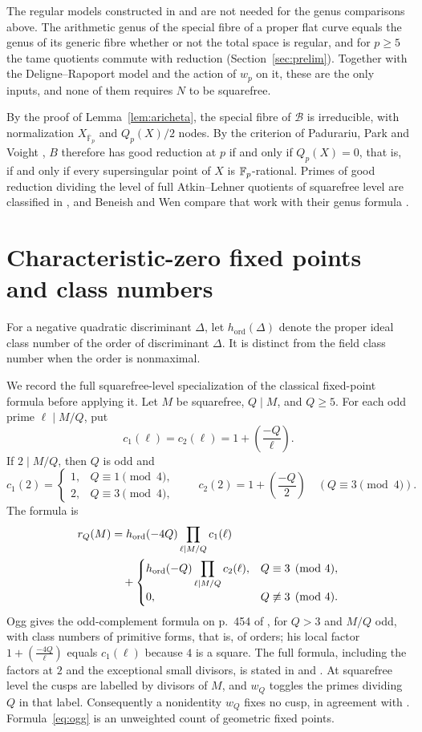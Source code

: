 \documentclass[11pt,a4paper]{article}
\theoremstyle{remark}\newtheorem{remark}[theorem]{Remark}
\numberwithin{equation}{section}
\newcommand{\kk}{\overline{\mathbb F}_p}
\newcommand{\leg}[2]{\left(\frac{#1}{#2}\right)}
\newcommand{\ho}{h_{\mathrm{ord}}}
\begin{document}
	The regular models constructed in \cite{Xue} and \cite{BW} are not needed for the genus comparisons above. The arithmetic genus of the special fibre of a proper flat curve equals the genus of its generic fibre whether or not the total space is regular, and for $p\geq5$ the tame quotients commute with reduction (Section~\ref{sec:prelim}). Together with the Deligne--Rapoport model and the action of $w_p$ on it, these are the only inputs, and none of them requires $N$ to be squarefree.
	
	By the proof of Lemma~\ref{lem:aricheta}, the special fibre of $\mathscr B$ is irreducible, with normalization $X_{\kk}$ and $Q_p(X)/2$ nodes. By the criterion of Padurariu, Park and Voight \cite[Corollary 3.2]{PPV}, $B$ therefore has good reduction at $p$ if and only if $Q_p(X)=0$, that is, if and only if every supersingular point of $X$ is $\mathbb F_p$-rational. Primes of good reduction dividing the level of full Atkin--Lehner quotients of squarefree level are classified in \cite{PPV}, and Beneish and Wen compare that work with their genus formula \cite[Remark 6.8]{BW}.
	
	\section{Characteristic-zero fixed points and class numbers}\label{sec:class}
	For a negative quadratic discriminant $\Delta$, let $\ho(\Delta)$ denote the proper ideal class number of the order of discriminant $\Delta$. It is distinct from the field class number when the order is nonmaximal.
	
	We record the full squarefree-level specialization of the classical fixed-point formula before applying it. Let $M$ be squarefree, $Q\mid M$, and $Q\geq5$. For each odd prime $\ell\mid M/Q$, put
	\[
	c_1(\ell)=c_2(\ell)=1+\leg{-Q}{\ell}.
	\]
	If $2\mid M/Q$, then $Q$ is odd and
	\[
	c_1(2)=\begin{cases}1,&Q\equiv1\pmod4,\\2,&Q\equiv3\pmod4,\end{cases}
	\qquad c_2(2)=1+\leg{-Q}{2}\quad(Q\equiv3\pmod4).
	\]
	The formula is
	\begin{align}
		r_Q(M)&=\ho(-4Q)\prod_{\ell\mid M/Q}c_1(\ell)\notag\\
		&\quad+\begin{cases}
			\ho(-Q)\displaystyle\prod_{\ell\mid M/Q}c_2(\ell),&Q\equiv3\pmod4,\\
			0,&Q\not\equiv3\pmod4.
		\end{cases}\label{eq:ogg}
	\end{align}
	Ogg gives the odd-complement formula on p.~454 of \cite{Ogg}, for $Q>3$ and $M/Q$ odd, with class numbers of primitive forms, that is, of orders; his local factor $1+\leg{-4Q}{\ell}$ equals $c_1(\ell)$ because $4$ is a square. The full formula, including the factors at $2$ and the exceptional small divisors, is stated in \cite[Remark 2, pp.~108--109]{FH} and \cite[Proposition 2.1]{IJK}. At squarefree level the cusps are labelled by divisors of $M$, and $w_Q$ toggles the primes dividing $Q$ in that label. Consequently a nonidentity $w_Q$ fixes no cusp, in agreement with \cite[Proposition 3]{Ogg}. Formula~\eqref{eq:ogg} is an unweighted count of geometric fixed points.
	
\end{document}
